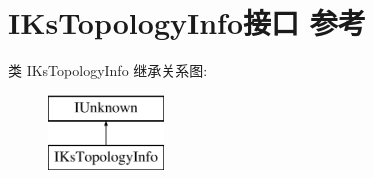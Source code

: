 \hypertarget{interface_i_ks_topology_info}{}\section{I\+Ks\+Topology\+Info接口 参考}
\label{interface_i_ks_topology_info}
类 I\+Ks\+Topology\+Info 继承关系图\+:\begin{figure}[H]
\begin{center}
\leavevmode
\includegraphics[height=2.000000cm]{interface_i_ks_topology_info}
\end{center}
\end{figure}
